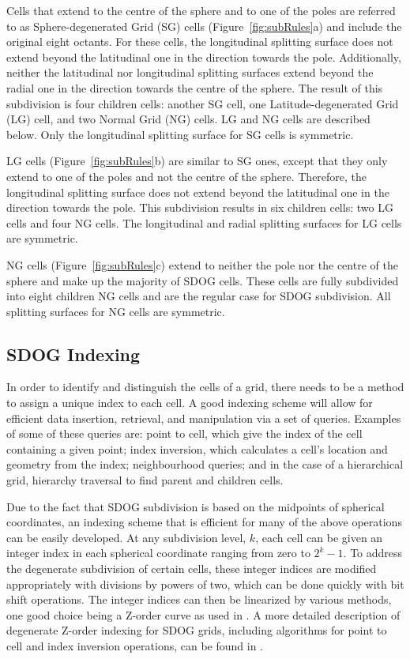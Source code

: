 Cells that extend to the centre of the sphere and to one of the poles are referred to as Sphere-degenerated Grid (SG) cells (Figure~\ref{fig:subRules}a) and include the original eight octants.
For these cells, the longitudinal splitting surface does not extend beyond the latitudinal one in the direction towards the pole.
Additionally, neither the latitudinal nor longitudinal splitting surfaces extend beyond the radial one in the direction towards the centre of the sphere.
The result of this subdivision is four children cells: another SG cell, one Latitude-degenerated Grid (LG) cell, and two Normal Grid (NG) cells.
LG and NG cells are described below.
Only the longitudinal splitting surface for SG cells is symmetric.


LG cells (Figure~\ref{fig:subRules}b) are similar to SG ones, except that they only extend to one of the poles and not the centre of the sphere.
Therefore, the longitudinal splitting surface does not extend beyond the latitudinal one in the direction towards the pole.
This subdivision results in six children cells: two LG cells and four NG cells.
The longitudinal and radial splitting surfaces for LG cells are symmetric.


NG cells (Figure~\ref{fig:subRules}c) extend to neither the pole nor the centre of the sphere and make up the majority of SDOG cells.
These cells are fully subdivided into eight children NG cells and are the regular case for SDOG subdivision.
All splitting surfaces for NG cells are symmetric.


\subsection{SDOG Indexing} \label{sec:sdog-indexing}
In order to identify and distinguish the cells of a grid, there needs to be a method to assign a unique index to each cell.
A good indexing scheme will allow for efficient data insertion, retrieval, and manipulation via a set of queries.
Examples of some of these queries are: point to cell, which give the index of the cell containing a given point; index inversion, which calculates a cell's location and geometry from the index; neighbourhood queries; and in the case of a hierarchical grid, hierarchy traversal to find parent and children cells.


Due to the fact that SDOG subdivision is based on the midpoints of spherical coordinates, an indexing scheme that is efficient for many of the above operations can be easily developed.
At any subdivision level, $k$, each cell can be given an integer index in each spherical coordinate ranging from zero to $2^{k} - 1$.
To address the degenerate subdivision of certain cells, these integer indices are modified appropriately with divisions by powers of two, which can be done quickly with bit shift operations.
The integer indices can then be linearized by various methods, one good choice being a Z-order curve \cite{morton1966computer} as used in \cite{yu2009sdog}.
A more detailed description of degenerate Z-order indexing for SDOG grids, including algorithms for point to cell and index inversion operations, can be found in \cite{yu2009coding}.


